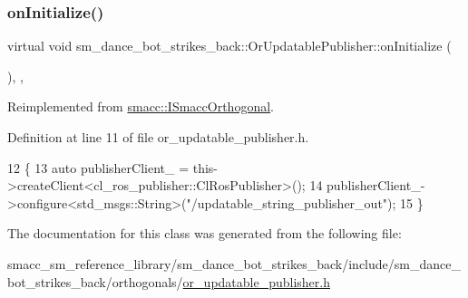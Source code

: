 \subsubsection{\texorpdfstring{on\+Initialize()}{onInitialize()}}
{\footnotesize\ttfamily virtual void sm\+\_\+dance\+\_\+bot\+\_\+strikes\+\_\+back\+::\+Or\+Updatable\+Publisher\+::on\+Initialize (\begin{DoxyParamCaption}{ }\end{DoxyParamCaption})\hspace{0.3cm}{\ttfamily [inline]}, {\ttfamily [override]}, {\ttfamily [virtual]}}



Reimplemented from \hyperlink{classsmacc_1_1ISmaccOrthogonal_a6bb31c620cb64dd7b8417f8705c79c7a}{smacc\+::\+I\+Smacc\+Orthogonal}.



Definition at line 11 of file or\+\_\+updatable\+\_\+publisher.\+h.


\begin{DoxyCode}
12     \{
13         \textcolor{keyword}{auto} publisherClient\_ = this->createClient<cl\_ros\_publisher::ClRosPublisher>();
14         publisherClient\_->configure<std\_msgs::String>(\textcolor{stringliteral}{"/updatable\_string\_publisher\_out"});
15     \}
\end{DoxyCode}


The documentation for this class was generated from the following file\+:\begin{DoxyCompactItemize}
\item 
smacc\+\_\+sm\+\_\+reference\+\_\+library/sm\+\_\+dance\+\_\+bot\+\_\+strikes\+\_\+back/include/sm\+\_\+dance\+\_\+bot\+\_\+strikes\+\_\+back/orthogonals/\hyperlink{sm__dance__bot__strikes__back_2include_2sm__dance__bot__strikes__back_2orthogonals_2or__updatable__publisher_8h}{or\+\_\+updatable\+\_\+publisher.\+h}\end{DoxyCompactItemize}

